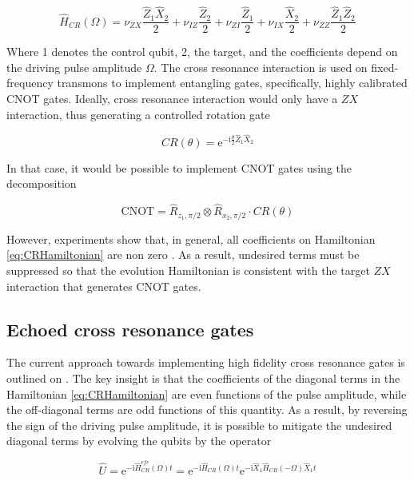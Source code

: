   \begin{equation}
    \hat{H}_{CR}(\Omega) = \nu_{ZX} \frac{\hat{Z}_1\hat{X}_2}{2} + \nu_{IZ} \frac{\hat{Z}_2}{2} + \nu_{ZI} \frac{\hat{Z}_1}{2} + \nu_{IX} \frac{\hat{X}_2}{2} + \nu_{ZZ} \frac{\hat{Z}_1\hat{Z}_2}{2}
    \label{eq:CRHamiltonian}
  \end{equation}

  Where 1 denotes the control qubit, 2, the target, and the coefficients depend on the driving pulse amplitude $\Omega$. The cross resonance interaction is used on fixed-frequency transmons to implement entangling gates, specifically, highly calibrated CNOT gates. Ideally, cross resonance interaction would only have a $ZX$ interaction, thus generating a controlled rotation gate

  \begin{equation}
    CR(\theta) = \mathrm{e}^{-\mathrm{i}\frac{\theta}{2}\hat{Z}_1\hat{X}_2}
  \end{equation}

  In that case, it would be possible to implement CNOT gates using the decomposition \cite{quantumEngineer}

  \begin{equation}
    \text{CNOT} = \hat{R}_{z_1, \pi/2} \otimes \hat{R}_{x_2, \pi/2} \cdot CR(\theta)
  \end{equation}

  However, experiments show that, in general, all coefficients on Hamiltonian \ref{eq:CRHamiltonian} are non zero \cite{DuplicatedRXZPulse, 2016RZXCalibration}. As a result, undesired terms must be suppressed so that the evolution Hamiltonian is consistent with the target $ZX$ interaction that generates CNOT gates.

  \subsection{Echoed cross resonance gates}

  The current approach towards implementing high fidelity cross resonance gates is outlined on \cite{DuplicatedRXZPulse}. The key insight is that the coefficients of the diagonal terms in the Hamiltonian \ref{eq:CRHamiltonian} are even functions of the pulse amplitude, while the off-diagonal terms are odd functions of this quantity. As a result, by reversing the sign of the driving pulse amplitude, it is possible to mitigate the undesired diagonal terms by evolving the qubits by the operator

  \begin{equation}
    \hat{U} = \mathrm{e}^{-\mathrm{i}\hat{H}_{CR}^{efe}(\Omega)t} = \mathrm{e}^{-\mathrm{i}\hat{H}_{CR}(\Omega)t} \mathrm{e}^{-\mathrm{i}\hat{X}_1\hat{H}_{CR}(-\Omega)\hat{X}_1t}
    \label{eq:pulseCREvolution}
  \end{equation}


